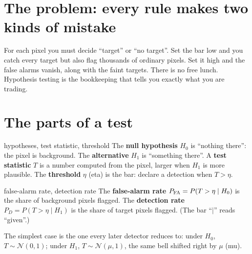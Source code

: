 \documentclass[11pt,a4paper,oneside,openany]{book}
\begin{document}
\section{The problem: every rule makes two kinds of mistake}

For each pixel you must decide ``target'' or ``no target''. Set the bar low and you catch every target but also flag thousands
of ordinary pixels. Set it high and the false alarms vanish, along with the faint targets. There is no free lunch. Hypothesis
testing is the bookkeeping that tells you exactly what you are trading.

\section{The parts of a test}

\begin{defn}{hypotheses, test statistic, threshold}
The \textbf{null hypothesis} $H_0$ is ``nothing there'': the pixel is background. The \textbf{alternative} $H_1$ is ``something
there''. A \textbf{test statistic} $T$ is a number computed from the pixel, larger when $H_1$ is more plausible. The
\textbf{threshold} $\eta$ (eta) is the bar: declare a detection when $T>\eta$.
\end{defn}

\begin{defn}{false-alarm rate, detection rate}
The \textbf{false-alarm rate} $P_{\rm FA}=P(T>\eta\mid H_0)$ is the share of background pixels flagged. The \textbf{detection
rate} $P_D=P(T>\eta\mid H_1)$ is the share of target pixels flagged. (The bar ``$\mid$'' reads ``given''.)
\end{defn}

The simplest case is the one every later detector reduces to: under $H_0$, $T\sim\mathcal N(0,1)$; under $H_1$,
$T\sim\mathcal N(\mu,1)$, the same bell shifted right by $\mu$ (mu).
\end{document}
